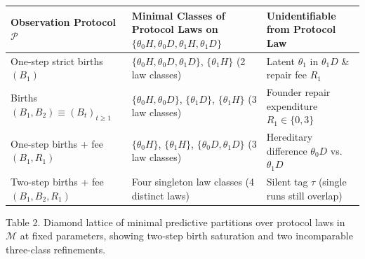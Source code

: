 \documentclass[11pt,letterpaper]{article}
\newcounter{none}
\begin{document}
{\def\LTcaptype{none} %
\begin{longtable}[]{@{}
  >{\raggedright\arraybackslash}p{}
  >{\raggedright\arraybackslash}p{}
  >{\raggedright\arraybackslash}p{}@{}}
\toprule\noalign{}
\begin{minipage}[b]{\linewidth}\raggedright
Observation Protocol \(\mathcal{P}\)
\end{minipage} & \begin{minipage}[b]{\linewidth}\raggedright
Minimal Classes of Protocol Laws on
\(\{\theta_0 H, \theta_0 D, \theta_1 H, \theta_1 D\}\)
\end{minipage} & \begin{minipage}[b]{\linewidth}\raggedright
Unidentifiable from Protocol Law
\end{minipage} \\
\midrule\noalign{}
\endhead
\bottomrule\noalign{}
\endlastfoot
One-step strict births \((B_1)\) &
\(\{\theta_0 H, \theta_0 D, \theta_1 D\}\), \(\{\theta_1 H\}\) (2 law
classes) & Latent \(\theta_1\) in \(\theta_1 D\) \& repair fee
\(R_1\) \\
Births \((B_1, B_2) \equiv (B_t)_{t\ge 1}\) &
\(\{\theta_0 H, \theta_0 D\}\), \(\{\theta_1 D\}\), \(\{\theta_1 H\}\)
(3 law classes) & Founder repair expenditure \(R_1 \in \{0,3\}\) \\
One-step births + fee \((B_1, R_1)\) & \(\{\theta_0 H\}\),
\(\{\theta_1 H\}\), \(\{\theta_0 D, \theta_1 D\}\) (3 law classes) &
Hereditary difference \(\theta_0 D\) vs.~\(\theta_1 D\) \\
Two-step births + fee \((B_1, B_2, R_1)\) & Four singleton law classes
(4 distinct laws) & Silent tag \(\tau\) (single runs still overlap) \\
\end{longtable}
}

Table 2. Diamond lattice of minimal predictive partitions over protocol
laws in \(\mathcal{M}\) at fixed parameters, showing two-step birth
saturation and two incomparable three-class refinements.
\end{document}
